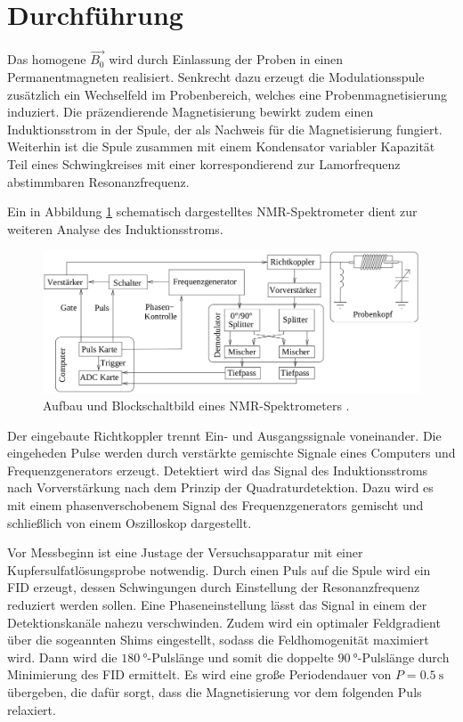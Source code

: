 \section{Durchführung}
\label{sec:Durchführung}

Das homogene $\vec{B_0}$ wird durch Einlassung der Proben in einen Permanentmagneten 
realisiert. Senkrecht dazu erzeugt die Modulationsspule zusätzlich ein Wechselfeld im Probenbereich,
welches eine Probenmagnetisierung induziert. Die präzendierende Magnetisierung
bewirkt zudem einen Induktionsstrom in der Spule, der als Nachweis für die Magnetisierung fungiert.
Weiterhin ist die Spule zusammen mit einem Kondensator variabler Kapazität Teil eines Schwingkreises
mit einer korrespondierend zur Lamorfrequenz abstimmbaren Resonanzfrequenz.

Ein in Abbildung \ref{fig:aufbau} schematisch dargestelltes NMR-Spektrometer dient zur weiteren
Analyse des Induktionsstroms.

\begin{figure}
    \centering
    \includegraphics[scale=0.4]{content/aufbau.png}
    \caption{Aufbau und Blockschaltbild eines NMR-Spektrometers \cite{Anleitung2}.}
    \label{fig:aufbau}
\end{figure}

Der eingebaute Richtkoppler trennt Ein- und Ausgangssignale voneinander.
Die eingeheden Pulse werden durch verstärkte gemischte Signale eines Computers und Frequenzgenerators erzeugt.
Detektiert wird das Signal des Induktionsstroms nach Vorverstärkung nach dem Prinzip der Quadraturdetektion.
Dazu wird es mit einem phasenverschobenem Signal des Frequenzgenerators gemischt und schließlich von einem
Oszilloskop dargestellt.

Vor Messbeginn ist eine Justage der Versuchsapparatur mit einer Kupfersulfatlösungsprobe notwendig.
Durch einen Puls auf die Spule wird ein FID erzeugt, dessen Schwingungen durch Einstellung der Resonanzfrequenz
reduziert werden sollen. Eine Phaseneinstellung lässt das Signal in einem der Detektionskanäle
nahezu verschwinden.
Zudem wird ein optimaler Feldgradient über die sogeannten Shims eingestellt, sodass die 
Feldhomogenität maximiert wird.
Dann wird die $\SI{180}{\degree}$-Pulslänge und somit die doppelte $\SI{90}{\degree}$-Pulslänge
durch Minimierung des FID ermittelt.
Es wird eine große Periodendauer von $P = \SI{0.5}{\second}$ übergeben, die dafür sorgt,
dass die Magnetisierung vor dem folgenden Puls relaxiert.

